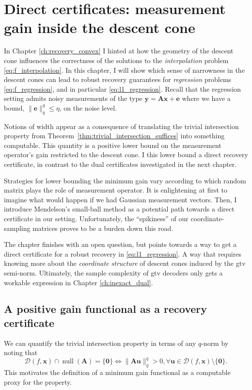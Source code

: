 \chapter{Direct certificates: measurement gain inside the descent cone}
\label{ch:lower_bound_min_gain}

In Chapter \ref{ch:recovery_convex} I hinted at how the geometry of the descent cone influences the correctness of the solutions to the \emph{interpolation} problem \eqref{eq:f_interpolation}. In this chapter, I will show which sense of narrowness in the descent cones can lead to robust recovery guarantees for \emph{regression} problems \eqref{eq:f_regression}, and in particular \eqref{eq:l1_regression}. Recall that the regression setting admits noisy measurements of the type $\mathbf{y} = \mathbf{Ax} + \mathbf{e}$ where we have a bound, $\|\mathbf{e}\|_q^q \leq \eta$, on the noise level.

Notions of width appear as a consequence of translating the trivial intersection property from Theorem~\ref{thm:trivial_intersection_suffices} into something computable. This quantity is a positive lower bound on the measurement operator's gain restricted to the descent cone. I this lower bound a direct recovery certificate, in contrast to the dual certificates investigated in the next chapter.

Strategies for lower bounding the minimum gain vary according to which random matrix plays the role of measurement operator. It is enlightening at first to imagine what would happen if we had Gaussian measurement vectors. Then, I introduce Mendelson's small-ball method as a potential path towards a direct certificate in our setting. Unfortunately, the ``spikiness'' of our coordinate-sampling matrices proves to be a burden down this road.

The chapter finishes with an open question, but points towards a way to get a direct certificate for a robust recovery in \eqref{eq:l1_regression}. A way that requires knowing more about the \emph{coordinate structure} of descent cones induced by the \acrshort{gtv} semi-norm. Ultimately, the sample complexity of \acrshort{gtv} decoders only gets a workable expression in Chapter \ref{ch:inexact_dual}.


\section{A positive gain functional as a recovery certificate}

We can quantify the trivial intersection property in terms of any $q$-norm by noting that
\begin{equation}
    \mathcal{D}(f, \mathbf{x}) \cap \operatorname{null} \left ( \mathbf{A} \right ) = \{ \mathbf{0} \} \iff \|\mathbf{Au}\|_q^q > 0, \forall \mathbf{u} \in \mathcal{D}(f, \mathbf{x}) \setminus \{ \mathbf{0} \}.
    \label{eq:trivial_intersect_equiv_lower_bound_gain}
\end{equation}
This motivates the definition of a minimum gain functional as a computable proxy for the property.

